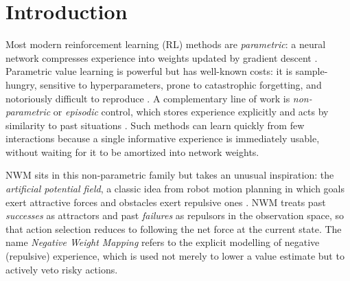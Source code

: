 \documentclass[11pt]{article}
\newcommand{\NWM}{\textsc{NWM}}
\begin{document}
\section{Introduction}
\label{sec:intro}

Most modern reinforcement learning (RL) methods are \emph{parametric}: a neural
network compresses experience into weights updated by gradient descent
\citep{mnih2015human,schulman2017proximal}. Parametric value learning is
powerful but has well-known costs: it is sample-hungry, sensitive to
hyperparameters, prone to catastrophic forgetting, and notoriously difficult to
reproduce \citep{henderson2018deep}. A complementary line of work is
\emph{non-parametric} or \emph{episodic} control, which stores experience
explicitly and acts by similarity to past situations
\citep{blundell2016model,pritzel2017neural}. Such methods can learn quickly from
few interactions because a single informative experience is immediately usable,
without waiting for it to be amortized into network weights.

\NWM{} sits in this non-parametric family but takes an unusual inspiration: the
\emph{artificial potential field}, a classic idea from robot motion planning in
which goals exert attractive forces and obstacles exert repulsive ones
\citep{khatib1986real}. \NWM{} treats past \emph{successes} as attractors and
past \emph{failures} as repulsors in the observation space, so that action
selection reduces to following the net force at the current state. The name
\emph{Negative Weight Mapping} refers to the explicit modelling of negative
(repulsive) experience, which is used not merely to lower a value estimate but
to actively veto risky actions.
\end{document}
